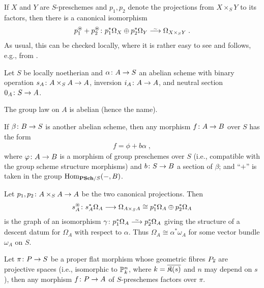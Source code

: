 \documentclass[a4paper,parskip=half,numbers=enddot, DIV=12]{scrreprt}
\begin{document}
If $X$ and $Y$ are $S$-preschemes and $p_1,p_2$ denote the projections from $X\times_SY$ to its factors, then there is a canonical isomorphism
\begin{align}\lbl{eq:p1p2Omega}
	p_1^\oast+p_2^\oast\colon p_1^*\Omega_X\oplus p_2^*\Omega_Y\isomorphism \Omega_{X\times_SY}\;.
\end{align}
As usual, this can be checked locally, where it is rather easy to see and follows, e.g., from \cite[Corollary~16.5]{eisenbudCommAlg}.
\begin{thm}
	Let $S$ be locally noetherian and $\alpha\colon A\morphism S$ an abelian scheme with binary operation $s_A\colon A\times_SA\morphism A$, inversion $i_A\colon A\morphism A$, and neutral section $0_A\colon S\morphism A$.
	\begin{alphanumerate}
		\item The group law on $A$ is abelian (hence the name).
		\item If $\beta\colon B\morphism S$ is another abelian scheme, then any morphism $f\colon A\morphism B$ over $S$ has the form
		\begin{align*}
			f=\phi+b\alpha\;,
		\end{align*}
		where $\phi\colon A\morphism B$ is a morphism of group preschemes over $S$ (i.e., compatible with the group scheme structure morphisms) and $b\colon S\morphism B$ a section of $\beta$; and ``$+$'' is taken in the group $\Hom_{\cat{PSch}/S}(-,B)$.
		\item Let $p_1,p_2\colon A\times_SA\morphism A$ be the two canonical projections. Then
		\begin{align*}
			s_A^\oast\colon s_A^*\Omega_A\morphism \Omega_{A\times_SA}\cong p_1^*\Omega_A\oplus p_2^*\Omega_A
		\end{align*}
		is the graph of an isomorphism $\gamma\colon p_1^*\Omega_A\isomorphism p_2^*\Omega_A$ giving the structure of a descent datum for $\Omega_A$ with respect to $\alpha$. Thus $\Omega_A\cong \alpha^*\omega_A$ for some vector bundle $\omega_A$ on $S$.
		\item Let $\pi\colon P\morphism S$ be a proper flat morphism whose geometric fibres $P_{\overline{s}}$ are projective spaces (i.e., isomorphic to $\mathbb{P}_k^n$, where $k=\overline{{\mathfrak{K}(s)}}$ and $n$ may depend on $s$), then any morphism $f\colon P\morphism A$ of $S$-preschemes factors over $\pi$.
	\end{alphanumerate}
\end{thm}
\end{document}
